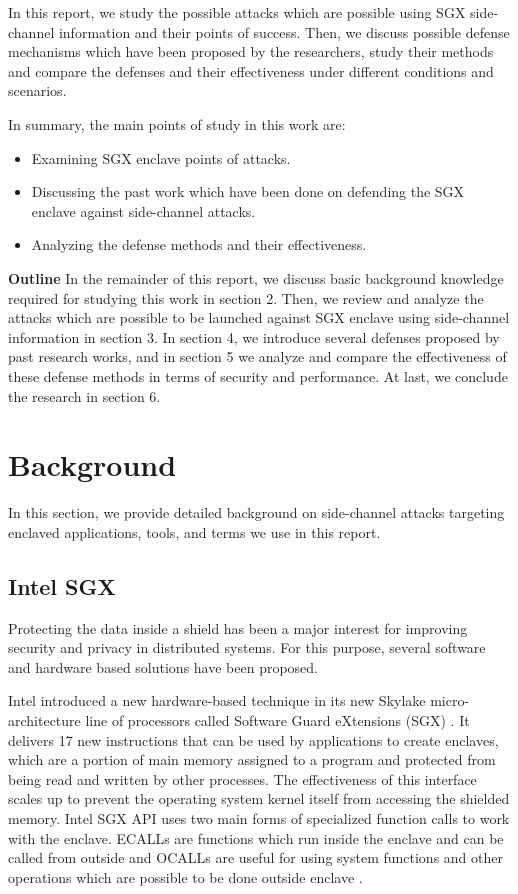 In this report, we study the possible attacks which are possible using SGX side-channel information and their points of success. Then, we discuss possible defense mechanisms which have been proposed by the researchers, study their methods and compare the defenses and their effectiveness under different conditions and scenarios.

In summary, the main points of study in this work are:
\begin{itemize}
	\item Examining SGX enclave points of attacks.
	\item Discussing the past work which have been done on defending the SGX enclave against side-channel attacks.
	\item Analyzing the defense methods and their effectiveness.
\end{itemize} 
\textbf{Outline} In the remainder of this report, we discuss basic background knowledge required for studying this work in section 2. Then, we review and analyze the attacks which are possible to be launched against SGX enclave using side-channel information in section 3. In section 4, we introduce several defenses proposed by past research works, and in section 5 we analyze and compare the effectiveness of these defense methods in terms of security and performance. At last, we conclude the research in section 6.
\section{Background}
In this section, we provide detailed background on side-channel attacks targeting enclaved applications, tools, and terms we use in this report.

\subsection{Intel SGX}

Protecting the data inside a shield has been a major interest for improving security and privacy in distributed systems. For this purpose, several software and hardware based solutions have been proposed.

Intel introduced a new hardware-based technique in its new Skylake micro-architecture \cite{skylake} line of processors called Software Guard eXtensions (SGX) \cite{sgx}. It delivers 17 new instructions that can be used by applications to create enclaves, which are a portion of main memory assigned to a program and protected from being read and written by other processes. The effectiveness of this interface scales up to prevent the operating system kernel itself from accessing the shielded memory. Intel SGX API \cite{sgxapi} uses two main forms of specialized function calls to work with the enclave. ECALLs are functions which run inside the enclave and can be called from outside and OCALLs are useful for using system functions and other operations which are possible to be done outside enclave \cite{ecallocall}.

